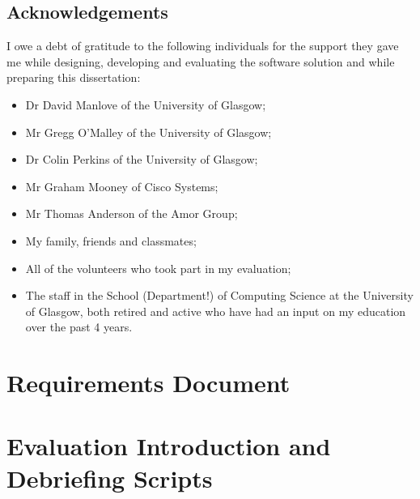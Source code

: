 \documentclass{l4proj}
\begin{document}
\section*{Acknowledgements}
I owe a debt of gratitude to the following individuals for the support they gave me while designing, developing and evaluating the software solution and while preparing this dissertation:
\begin{itemize}
\item Dr David Manlove of the University of Glasgow;
\item Mr Gregg O'Malley of the University of Glasgow;
\item Dr Colin Perkins of the University of Glasgow;
\item Mr Graham Mooney of Cisco Systems;
\item Mr Thomas Anderson of the Amor Group;
\item My family, friends and classmates;
\item All of the volunteers who took part in my evaluation;
\item The staff in the School (Department!) of Computing Science at the University of Glasgow, both retired and active who have had an input on my education over the past 4 years.
\end{itemize}

\educationalconsent
%

\tableofcontents
\glsresetall{}

\glsresetall{}

\glsresetall{}

\glsresetall{}

\glsresetall{}

\glsresetall{}

\glsresetall{}

\glsresetall{}


\appendix

\printglossaries




\chapter{Requirements Document}


\chapter{Evaluation Introduction and Debriefing Scripts}

\end{document}
